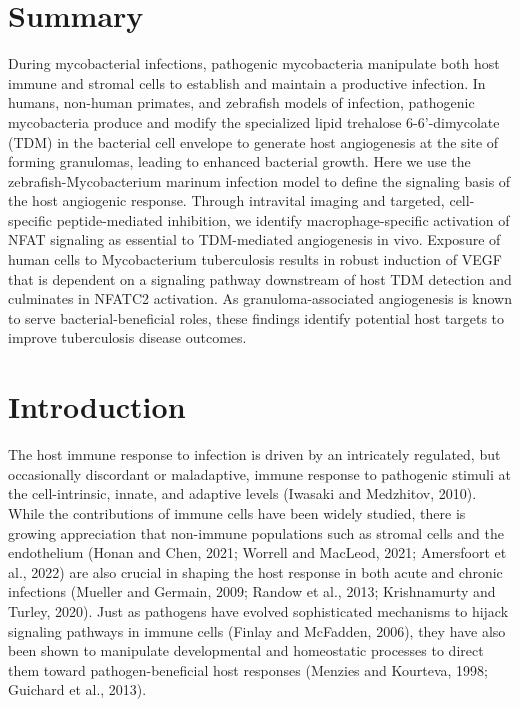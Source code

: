 


\section{Summary}
During mycobacterial infections, pathogenic mycobacteria manipulate both host immune and stromal cells to establish and maintain a productive infection. In humans, non-human primates, and zebrafish models of infection, pathogenic mycobacteria produce and modify the specialized lipid trehalose 6-6’-dimycolate (TDM) in the bacterial cell envelope to generate host angiogenesis at the site of forming granulomas, leading to enhanced bacterial growth. Here we use the zebrafish-Mycobacterium marinum infection model to define the signaling basis of the host angiogenic response. Through intravital imaging and targeted, cell-specific peptide-mediated inhibition, we identify macrophage-specific activation of NFAT signaling as essential to TDM-mediated angiogenesis in vivo.  Exposure of human cells to Mycobacterium tuberculosis results in robust induction of VEGF that is dependent on a signaling pathway downstream of host TDM detection and culminates in NFATC2 activation. As granuloma-associated angiogenesis is known to serve bacterial-beneficial roles, these findings identify potential host targets to improve tuberculosis disease outcomes.

\section{Introduction}

The host immune response to infection is driven by an intricately regulated, but occasionally discordant or maladaptive, immune response to pathogenic stimuli at the cell-intrinsic, innate, and adaptive levels (Iwasaki and Medzhitov, 2010). While the contributions of immune cells have been widely studied, there is growing appreciation that non-immune populations such as stromal cells and the endothelium (Honan and Chen, 2021; Worrell and MacLeod, 2021; Amersfoort et al., 2022) are also crucial in shaping the host response in both acute and chronic infections (Mueller and Germain, 2009; Randow et al., 2013; Krishnamurty and Turley, 2020). Just as pathogens have evolved sophisticated mechanisms to hijack signaling pathways in immune cells (Finlay and McFadden, 2006), they have also been shown to manipulate developmental and homeostatic processes to direct them toward pathogen-beneficial host responses (Menzies and Kourteva, 1998; Guichard et al., 2013).

